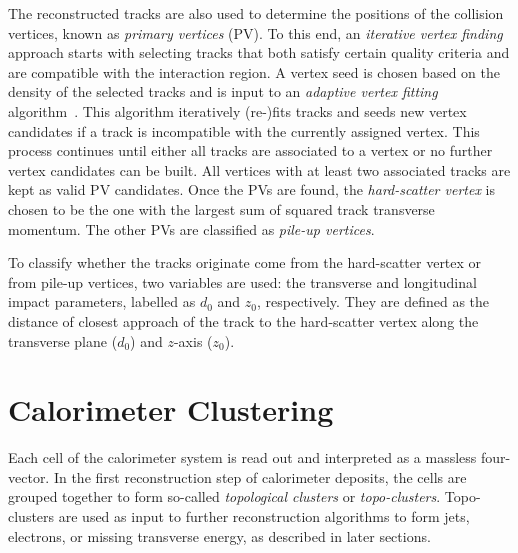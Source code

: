 The reconstructed tracks are also used to determine the positions of the collision vertices, known as \emph{primary vertices} (PV). To this end, an \emph{iterative vertex finding} approach \cite{PERF-2015-01} starts with selecting tracks that both satisfy certain quality criteria and are compatible with the interaction region. A vertex seed is chosen based on the density of the selected tracks and is input to an \emph{adaptive vertex fitting} algorithm~\cite{0954-3899-34-12-N01}.
This algorithm iteratively (re-)fits tracks and seeds new vertex candidates if a track is incompatible with the currently assigned vertex.
This process continues until either all tracks are associated to a vertex or no further vertex candidates can be built.
All vertices with at least two associated tracks are kept as valid PV candidates.
Once the PVs are found, the \emph{hard-scatter vertex} is chosen to be the one with the largest sum of squared track transverse momentum. The other PVs are classified as \emph{pile-up vertices}.

To classify whether the tracks originate come from the hard-scatter vertex or from pile-up vertices, two variables are used: the transverse and longitudinal impact parameters, labelled as $d_0$ and $z_0$, respectively. They are defined as the distance of closest approach of the track to the hard-scatter vertex along the transverse plane ($d_0$) and $z$-axis ($z_0$).




\section{Calorimeter Clustering}
\label{sec:calo-clustering}
Each cell of the calorimeter system is read out and interpreted as a massless four-vector. In the first reconstruction step of calorimeter deposits, the cells are grouped together to form so-called \emph{topological clusters} or \emph{topo-clusters}. Topo-clusters are used as input to further reconstruction algorithms to form jets, electrons, or missing transverse energy, as described in later sections.

